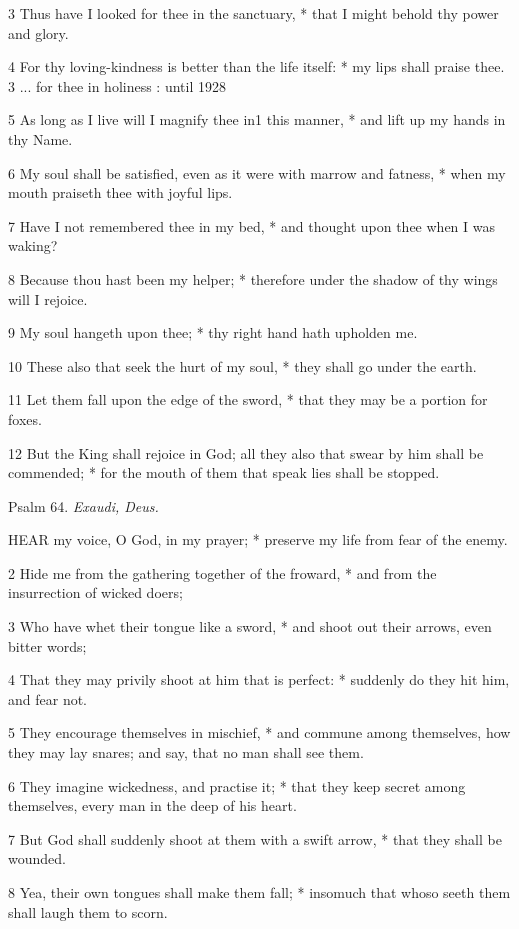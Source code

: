 3 Thus have I looked for thee in the sanctuary, * that I might behold thy
power and glory.

4 For thy loving-kindness is better than the life itself:
* my lips shall praise thee. 3 ... for thee in holiness
: until
1928

5 As long as I live will I magnify thee in1 this manner, *
and lift up my hands in thy Name.

6 My soul shall be satisfied, even as it were with
marrow and fatness, * when my mouth praiseth thee with joyful lips.

7 Have I not remembered thee in my bed, * and thought
upon thee when I was waking?

8 Because thou hast been my helper; * therefore under
the shadow of thy wings will I rejoice.

9 My soul hangeth upon thee; * thy right hand hath
upholden me.

10 These also that seek the hurt of my soul, * they
shall go under the earth.

11 Let them fall upon the edge of the sword, * that
they may be a portion for foxes.

12 But the King shall rejoice in God; all they also
that swear by him shall be commended; * for the mouth of them that speak
lies shall be stopped.

Psalm
64. \emph{Exaudi, Deus.}

HEAR
my voice, O God, in my prayer; * preserve my life from fear of the enemy.

2 Hide me from the gathering together of the froward,
* and from the insurrection of wicked doers;

3 Who have whet their tongue like a sword, * and shoot
out their arrows, even bitter words;

4 That they may privily shoot at him that is perfect:
* suddenly do they hit him, and fear not.

5 They encourage themselves in mischief, * and commune
among themselves, how they may lay snares; and say, that no man shall
see them.

6 They imagine wickedness, and practise it; * that
they keep secret among themselves, every man in the deep of his heart.

7 But God shall suddenly shoot at them with a swift
arrow, * that they shall be wounded.

8 Yea, their own tongues shall make them fall; * insomuch
that whoso seeth them shall laugh them to scorn.

